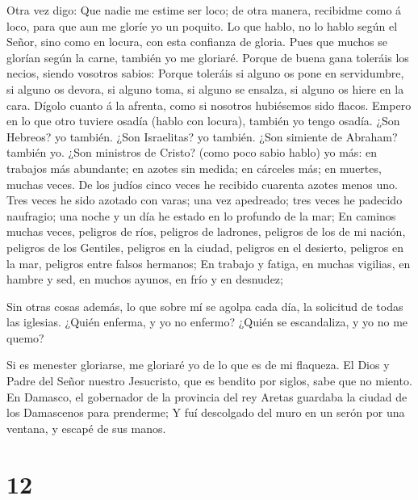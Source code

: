  Otra vez digo: Que nadie me estime ser loco; de otra
manera, recibidme como á loco, para que aun me gloríe yo un poquito.
 Lo que hablo, no lo hablo según el Señor, sino como en
locura, con esta confianza de gloria.  Pues que muchos se
glorían según la carne, también yo me gloriaré.  Porque de
buena gana toleráis los necios, siendo vosotros sabios: 
Porque toleráis si alguno os pone en servidumbre, si alguno os devora,
si alguno toma, si alguno se ensalza, si alguno os hiere en la cara.
 Dígolo cuanto á la afrenta, como si nosotros hubiésemos
sido flacos. Empero en lo que otro tuviere osadía (hablo con locura),
también yo tengo osadía.  ¿Son Hebreos? yo también. ¿Son
Israelitas? yo también. ¿Son simiente de Abraham? también yo.
 ¿Son ministros de Cristo? (como poco sabio hablo) yo más:
en trabajos más abundante; en azotes sin medida; en cárceles más; en
muertes, muchas veces.  De los judíos cinco veces he
recibido cuarenta azotes menos uno.  Tres veces he sido
azotado con varas; una vez apedreado; tres veces he padecido naufragio;
una noche y un día he estado en lo profundo de la mar;  En
caminos muchas veces, peligros de ríos, peligros de ladrones, peligros
de los de mi nación, peligros de los Gentiles, peligros en la ciudad,
peligros en el desierto, peligros en la mar, peligros entre falsos
hermanos;  En trabajo y fatiga, en muchas vigilias, en
hambre y sed, en muchos ayunos, en frío y en desnudez;

 Sin otras cosas además, lo que sobre mí se agolpa cada
día, la solicitud de todas las iglesias.  ¿Quién enferma, y
yo no enfermo? ¿Quién se escandaliza, y yo no me quemo?

 Si es menester gloriarse, me gloriaré yo de lo que es de
mi flaqueza.  El Dios y Padre del Señor nuestro Jesucristo,
que es bendito por siglos, sabe que no miento.  En Damasco,
el gobernador de la provincia del rey Aretas guardaba la ciudad de los
Damascenos para prenderme;  Y fuí descolgado del muro en un
serón por una ventana, y escapé de sus manos.

\hypertarget{section-11}{%
\section{12}\label{section-11}}

